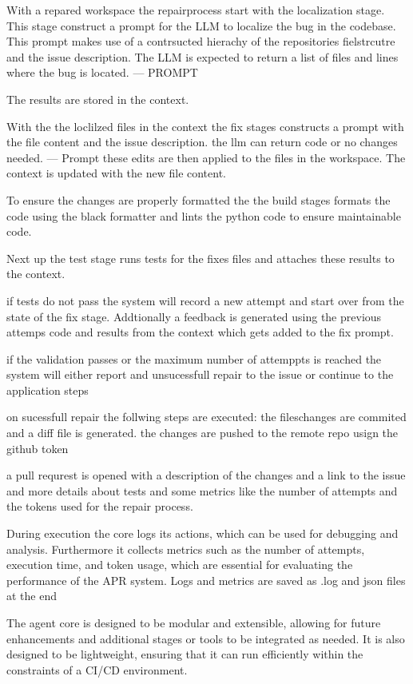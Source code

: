 With a repared workspace the repairprocess start with the localization stage. This stage construct a prompt for the LLM to localize the bug in the codebase. This prompt makes use of a contrsucted hierachy of the repositories fielstrcutre and the issue description. The LLM is expected to return a list of files and lines where the bug is located.
--- PROMPT

The results are stored in the context.

With the the loclilzed files in the context the fix stages constructs a prompt with the file content and the issue description. the llm can return code or no changes needed.
--- Prompt
these edits are then applied to the files in the workspace. The context is updated with the new file content.

To ensure the changes are properly formatted the the build stages formats the code using the black formatter and lints the python code to ensure maintainable code.

Next up the test stage runs tests for the fixes files and attaches these results to the context.

if tests do not pass the system will record a new attempt and start over from the state of the fix stage. Addtionally a feedback is generated using the previous attemps code and results from the context which gets added to the fix prompt.

if the validation passes or  the maximum number of attemppts is reached the system will either report and unsucessfull repair to the issue or continue to the application steps

on sucessfull repair the follwing steps are executed:
the fileschanges are commited and a diff file is generated.
the changes are pushed to the remote repo usign the github token

a pull requrest is opened with a description of the changes and a link to the issue and more details about tests and some metrics like the number of attempts and the tokens used for the repair process.

During execution the core logs its actions, which can be used for debugging and analysis. Furthermore it collects metrics such as the number of attempts, execution time, and token usage, which are essential for evaluating the performance of the APR system. Logs and metrics are saved as .log and json files at the end

The agent core is designed to be modular and extensible, allowing for future enhancements and additional stages or tools to be integrated as needed. It is also designed to be lightweight, ensuring that it can run efficiently within the constraints of a CI/CD environment.



